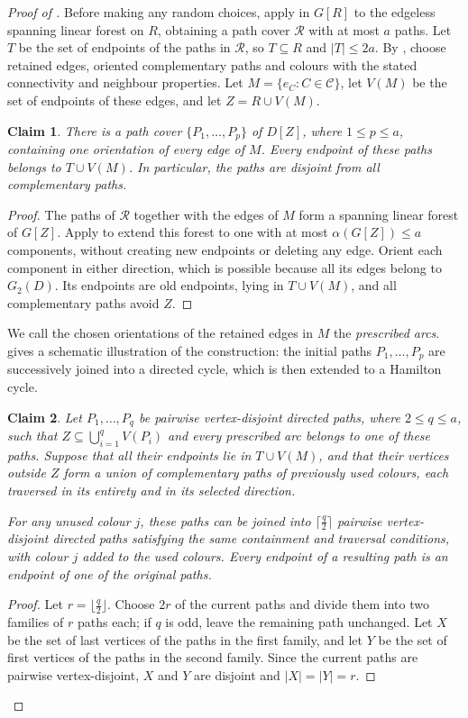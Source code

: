 \documentclass[11pt,a4paper]{article}
\newtheorem{claim}{Claim}
\theoremstyle{remark}
\numberwithin{equation}{section}
\newcommand{\calC}{\mathcal{C}}
\begin{document}
\begin{proof}[Proof of ]
		Before making any random choices, apply 
		in $G[R]$ to the edgeless spanning linear forest on $R$, obtaining a path cover
		$\mathcal R$ with at most $a$ paths.
		Let $T$ be the set of endpoints of the paths in $\mathcal R$, so $T\subseteq R$ and $|T|\le2a$.
		By , choose retained edges, oriented complementary paths and colours with
		the stated connectivity and neighbour properties.
		Let $M=\{e_C:C\in\calC\}$, let $V(M)$ be the set of endpoints of these edges, and let $Z=R\cup V(M)$.
	\begin{claim}\label{cl:initial}
		There is a path cover $\{P_1,\ldots,P_p\}$ of $D[Z]$, where
		$1\le p\le a$, containing one orientation of every edge of $M$.
		Every endpoint of these paths belongs to $T\cup V(M)$.
		In particular, the paths are disjoint from all complementary paths.
	\end{claim}
		\begin{proof}
			The paths of $\mathcal R$ together with the edges of $M$ form a spanning linear forest of $G[Z]$.
			Apply  to extend this forest to one with at most $\alpha(G[Z])\le a$
			components, without creating new endpoints or deleting any edge.
			Orient each component in either direction, which is possible because all its edges belong to $G_2(D)$.
			Its endpoints are old endpoints, lying in $T\cup V(M)$, and all complementary paths avoid $Z$.
		\end{proof}
		We call the chosen orientations of the retained edges in $M$
		the \emph{prescribed arcs}.
		 gives a schematic illustration of the
		construction: the initial paths $P_1,\dots,P_p$ are successively joined into a directed
		cycle, which is then extended to a Hamilton cycle.
		\begin{claim}\label{cl:merging}
			Let $P_1,\ldots,P_q$ be pairwise vertex-disjoint directed paths,
			where $2\le q\le a$, such that
			$Z\subseteq\bigcup_{i=1}^q V(P_i)$ and every prescribed arc belongs
			to one of these paths.
			Suppose that all their endpoints lie in $T\cup V(M)$, and that their
			vertices outside $Z$ form a union of complementary paths of
			previously used colours, each traversed in its entirety and in
			its selected direction.
			
			For any unused colour $j$, these paths can be joined into
			$\lceil \frac{q}{2}\rceil$ pairwise vertex-disjoint directed paths
			satisfying the same containment and traversal conditions,
			with colour $j$ added to the used colours.
			Every endpoint of a resulting path is an endpoint of one of the original paths.
		\end{claim}
		\begin{proof}
			Let $r=\lfloor \frac{q}{2}\rfloor$. Choose $2r$ of the current paths and divide
			them into two families of $r$ paths each; if $q$ is odd, leave the remaining
			path unchanged. Let $X$ be the set of last vertices of the paths in the first
			family, and let $Y$ be the set of first vertices of the paths in the second
			family. Since the current paths are pairwise vertex-disjoint, $X$ and $Y$
			are disjoint and $|X|=|Y|=r$.
			

\end{proof}
\end{proof}
\end{document}
